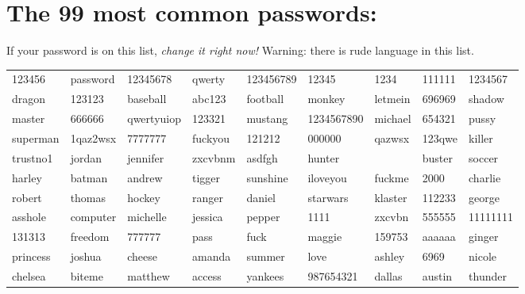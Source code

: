\documentclass{tufte-handout}
\begin{document}
\section{The 99 most common passwords:}

If your password is on this list, \emph{change it right now!} Warning:
there is rude language in this list.

\begin{tabular}{lllllllll}

123456 & password & 12345678 & qwerty & 123456789 & 12345 & 1234 & 111111 & 1234567 \\
dragon & 123123 & baseball & abc123 & football & monkey & letmein & 696969 & shadow \\
master & 666666 & qwertyuiop & 123321 & mustang & 1234567890 & michael & 654321 & pussy \\
superman & 1qaz2wsx & 7777777 & fuckyou & 121212 & 000000 & qazwsx & 123qwe & killer \\
trustno1 & jordan & jennifer & zxcvbnm & asdfgh & hunter &  & buster & soccer \\
harley & batman & andrew & tigger & sunshine & iloveyou & fuckme & 2000 & charlie \\
robert & thomas & hockey & ranger & daniel & starwars & klaster & 112233 & george \\
asshole & computer & michelle & jessica & pepper & 1111 & zxcvbn & 555555 & 11111111 \\
131313 & freedom & 777777 & pass & fuck & maggie & 159753 & aaaaaa & ginger \\
princess & joshua & cheese & amanda & summer & love & ashley & 6969 & nicole \\
chelsea & biteme & matthew & access & yankees & 987654321 & dallas & austin & thunder \\
\end{tabular}
\end{document}
